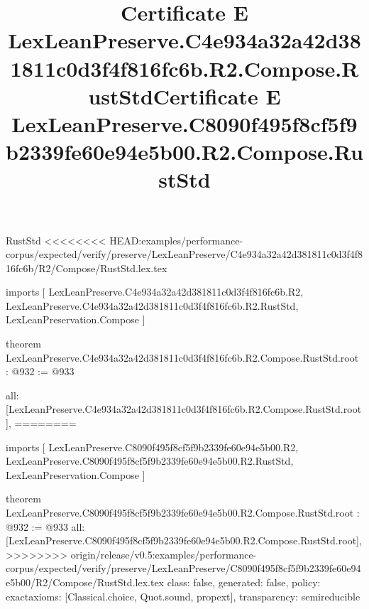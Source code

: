 \begin{lexlean}{RustStd}
<<<<<<<< HEAD:examples/performance-corpus/expected/verify/preserve/LexLeanPreserve/C4e934a32a42d381811c0d3f4f816fc6b/R2/Compose/RustStd.lex.tex
\title{Certificate E LexLeanPreserve.C4e934a32a42d381811c0d3f4f816fc6b.R2.Compose.RustStd}
\begin{coremodule}
imports [
  LexLeanPreserve.C4e934a32a42d381811c0d3f4f816fc6b.R2,
  LexLeanPreserve.C4e934a32a42d381811c0d3f4f816fc6b.R2.RustStd,
  LexLeanPreservation.Compose
]

theorem LexLeanPreserve.C4e934a32a42d381811c0d3f4f816fc6b.R2.Compose.RustStd.root : @932 := @933 {
  all: [LexLeanPreserve.C4e934a32a42d381811c0d3f4f816fc6b.R2.Compose.RustStd.root],
========
\title{Certificate E LexLeanPreserve.C8090f495f8cf5f9b2339fe60e94e5b00.R2.Compose.RustStd}
\begin{coremodule}
imports [
  LexLeanPreserve.C8090f495f8cf5f9b2339fe60e94e5b00.R2,
  LexLeanPreserve.C8090f495f8cf5f9b2339fe60e94e5b00.R2.RustStd,
  LexLeanPreservation.Compose
]

theorem LexLeanPreserve.C8090f495f8cf5f9b2339fe60e94e5b00.R2.Compose.RustStd.root : @932 := @933 {
  all: [LexLeanPreserve.C8090f495f8cf5f9b2339fe60e94e5b00.R2.Compose.RustStd.root],
>>>>>>>> origin/release/v0.5:examples/performance-corpus/expected/verify/preserve/LexLeanPreserve/C8090f495f8cf5f9b2339fe60e94e5b00/R2/Compose/RustStd.lex.tex
  class: false,
  generated: false,
  policy: exact{axioms: [Classical.choice, Quot.sound, propext]},
  transparency: semireducible
}


\end{coremodule}}
\end{coremodule}
\end{lexlean}
